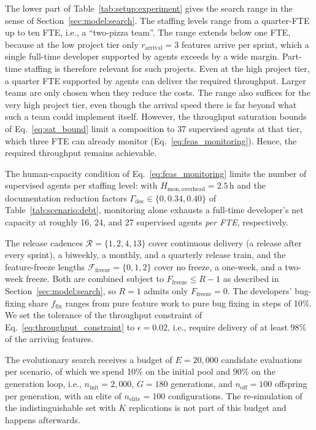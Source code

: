 \documentclass[smallextended]{svjour3}       %
\begin{document}
The lower part of Table~\ref{tab:setup:experiment} gives the search range in the sense of Section~\ref{sec:model:search}. The staffing levels range from a quarter-FTE up to ten FTE, i.e., a ``two-pizza team''. The range extends below one FTE, because at the low project tier only $r_\mathrm{arrival} = 3$ features arrive per sprint, which a single full-time developer supported by agents exceeds by a wide margin. Part-time staffing is therefore relevant for such projects. Even at the high project tier, a quarter FTE supported by agents can deliver the required throughput. Larger teams are only chosen when they reduce the costs. The range also suffices for the very high project tier, even though the arrival speed there is far beyond what such a team could implement itself. However, the throughput saturation bounds of Eq.~\eqref{eq:sat_bound} limit a composition to 37 supervised agents at that tier, which three FTE can already monitor (Eq.~\eqref{eq:feas_monitoring}). Hence, the required throughput remains achievable.

The human-capacity condition of Eq.~\eqref{eq:feas_monitoring} limits the number of supervised agents per staffing level: with $H_\mathrm{mon,overhead} = 2.5$\,h and the documentation reduction factors $\Gamma_\mathrm{doc} \in \{0, 0.34, 0.40\}$ of Table~\ref{tab:scenario:debt}, monitoring alone exhausts a full-time developer's net capacity at roughly 16, 24, and 27 supervised agents \emph{per FTE}, respectively.

The release cadences $\mathcal{R} = \{1, 2, 4, 13\}$ cover continuous delivery (a release after every sprint), a biweekly, a monthly, and a quarterly release train, and the feature-freeze lengths $\mathcal{F}_\mathrm{freeze} = \{0, 1, 2\}$ cover no freeze, a one-week, and a two-week freeze. Both are combined subject to $F_\mathrm{freeze} \leq R - 1$ as described in Section~\ref{sec:model:search}, so $R = 1$ admits only $F_\mathrm{freeze} = 0$. The developers' bug-fixing share $f_\mathrm{fix}$ ranges from pure feature work to pure bug fixing in steps of 10\%. We set the tolerance of the throughput constraint of Eq.~\eqref{eq:throughput_constraint} to $\epsilon = 0.02$, i.e., require delivery of at least 98\% of the arriving features. 

The evolutionary search receives a budget of $E = 20{,}000$ candidate evaluations per scenario, of which we spend 10\% on the initial pool and 90\% on the generation loop, i.e., $n_\mathrm{init} = 2{,}000$, $G = 180$ generations, and $n_\mathrm{off} = 100$ offspring per generation, with an elite of $n_\mathrm{elite} = 100$ configurations. The re-simulation of the indistinguishable set with $K$ replications is not part of this budget and happens afterwards.
\end{document}

